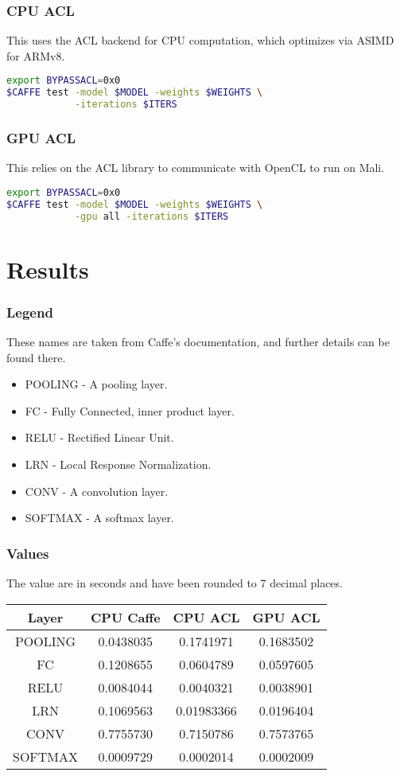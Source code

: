 \documentclass[12pt, a4paper, notitlepage]{report}
\begin{document}
\subsubsection*{CPU ACL}
This uses the ACL backend for CPU computation, which optimizes via ASIMD for ARMv8.\cite{acl}
\begin{lstlisting}[language=bash]
export BYPASSACL=0x0
$CAFFE test -model $MODEL -weights $WEIGHTS \
            -iterations $ITERS
\end{lstlisting}

\subsubsection*{GPU ACL}
This relies on the ACL library to communicate with OpenCL to run on Mali.\cite{acl}
\begin{lstlisting}[language=bash]
export BYPASSACL=0x0
$CAFFE test -model $MODEL -weights $WEIGHTS \
            -gpu all -iterations $ITERS
\end{lstlisting}

\section*{Results}
\subsubsection*{Legend}
These names are taken from Caffe's documentation, and further details can be found there.\cite{caffe}
\begin{itemize}
	\item POOLING - A pooling layer.
	\item FC - Fully Connected, inner product layer.
	\item RELU - Rectified Linear Unit.
	\item LRN - Local Response Normalization.
	\item CONV - A convolution layer.
	\item SOFTMAX - A softmax layer.
\end{itemize}

\subsubsection*{Values}
The value are in seconds and have been rounded to 7 decimal places.
\begin{center}
\begin{tabular}{ | c | c | c | c |}
\hline
Layer & CPU Caffe & CPU ACL & GPU ACL \\
\hline
POOLING & 0.0438035 & 0.1741971 & 0.1683502 \\
\hline
FC & 0.1208655 & 0.0604789 & 0.0597605 \\
\hline
RELU & 0.0084044 & 0.0040321 & 0.0038901 \\
\hline
LRN & 0.1069563 & 0.01983366 & 0.0196404 \\
\hline
CONV & 0.7755730 & 0.7150786 & 0.7573765 \\
\hline
SOFTMAX & 0.0009729 & 0.0002014 & 0.0002009 \\
\hline
\end{tabular}
\end{center}
\end{document}
